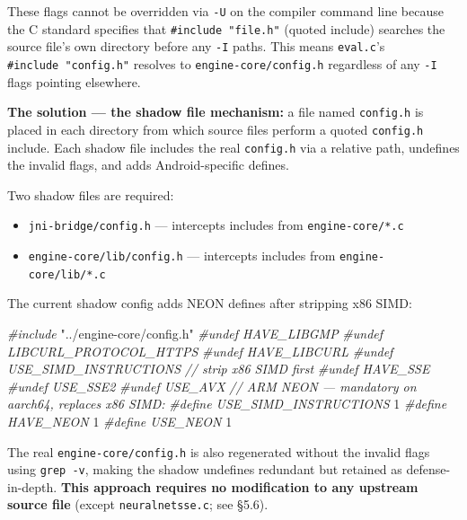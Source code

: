 \documentclass[11pt,a4paper]{article}
\newenvironment{Shaded}{%
  \setlength{\FrameSep}{4pt}%
  \definecolor{shadecolor}{RGB}{245,245,245}%
  \begin{snugshade}\footnotesize
}{\end{snugshade}}
\newcommand{\CommentTok}[1]{\textcolor[rgb]{0.56,0.35,0.01}{\textit{#1}}}
\newcommand{\DecValTok}[1]{\textcolor[rgb]{0.00,0.00,0.81}{#1}}
\newcommand{\ImportTok}[1]{#1}
\newcommand{\PreprocessorTok}[1]{\textcolor[rgb]{0.56,0.35,0.01}{\textit{#1}}}
\providecommand{\tightlist}{\setlength{\itemsep}{2pt}\setlength{\parskip}{0pt}}
\begin{document}
These flags cannot be overridden via \texttt{-U} on the compiler command
line because the C standard specifies that \texttt{\#include\ "file.h"}
(quoted include) searches the source file's own directory before any
\texttt{-I} paths. This means \texttt{eval.c}'s
\texttt{\#include\ "config.h"} resolves to \texttt{engine-core/config.h}
regardless of any \texttt{-I} flags pointing elsewhere.

\textbf{The solution --- the shadow file mechanism:} a file named
\texttt{config.h} is placed in each directory from which source files
perform a quoted \texttt{config.h} include. Each shadow file includes
the real \texttt{config.h} via a relative path, undefines the invalid
flags, and adds Android-specific defines.

Two shadow files are required:

\begin{itemize}
\tightlist
\item
  \texttt{jni-bridge/config.h} --- intercepts includes from
  \texttt{engine-core/*.c}
\item
  \texttt{engine-core/lib/config.h} --- intercepts includes from
  \texttt{engine-core/lib/*.c}
\end{itemize}

The current shadow config adds NEON defines after stripping x86 SIMD:

\begin{Shaded}
\begin{Highlighting}[]
\PreprocessorTok{\#include }\ImportTok{"../engine{-}core/config.h"}
\PreprocessorTok{\#undef HAVE\_LIBGMP}
\PreprocessorTok{\#undef LIBCURL\_PROTOCOL\_HTTPS}
\PreprocessorTok{\#undef HAVE\_LIBCURL}
\PreprocessorTok{\#undef USE\_SIMD\_INSTRUCTIONS   }\CommentTok{// strip x86 SIMD first}
\PreprocessorTok{\#undef HAVE\_SSE}
\PreprocessorTok{\#undef USE\_SSE2}
\PreprocessorTok{\#undef USE\_AVX}
\CommentTok{// ARM NEON — mandatory on aarch64, replaces x86 SIMD:}
\PreprocessorTok{\#define USE\_SIMD\_INSTRUCTIONS }\DecValTok{1}
\PreprocessorTok{\#define HAVE\_NEON }\DecValTok{1}
\PreprocessorTok{\#define USE\_NEON }\DecValTok{1}
\end{Highlighting}
\end{Shaded}

The real \texttt{engine-core/config.h} is also regenerated without the
invalid flags using \texttt{grep\ -v}, making the shadow undefines
redundant but retained as defense-in-depth. \textbf{This approach
requires no modification to any upstream source file} (except
\texttt{neuralnetsse.c}; see §5.6).
\end{document}
